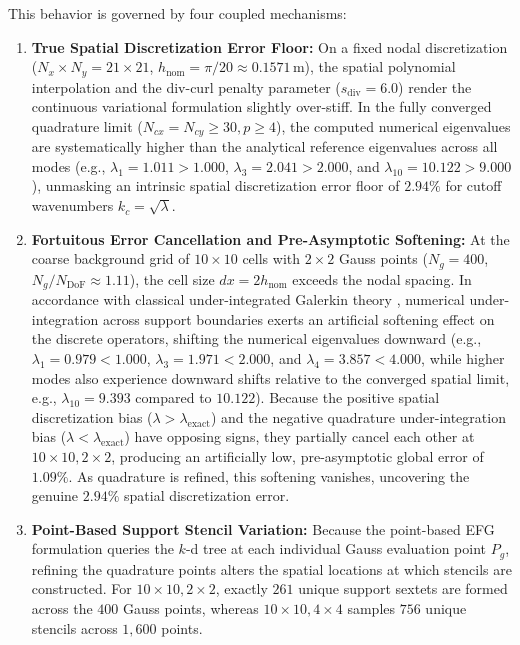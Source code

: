 \documentclass[preprint,12pt]{elsarticle}
\begin{document}
This behavior is governed by four coupled mechanisms:
\begin{enumerate}
    \item \textbf{True Spatial Discretization Error Floor:} On a fixed nodal discretization ($N_x \times N_y = 21 \times 21$, $h_{\mathrm{nom}} = \pi/20 \approx 0.1571$\,m), the spatial polynomial interpolation and the div-curl penalty parameter ($s_{\mathrm{div}} = 6.0$) render the continuous variational formulation slightly over-stiff. In the fully converged quadrature limit ($N_{cx} = N_{cy} \ge 30, p \ge 4$), the computed numerical eigenvalues are systematically higher than the analytical reference eigenvalues across all modes (e.g., $\lambda_1 = 1.011 > 1.000$, $\lambda_3 = 2.041 > 2.000$, and $\lambda_{10} = 10.122 > 9.000$), unmasking an intrinsic spatial discretization error floor of $2.94\%$ for cutoff wavenumbers $k_c = \sqrt{\lambda}$.

    \item \textbf{Fortuitous Error Cancellation and Pre-Asymptotic Softening:} At the coarse background grid of $10 \times 10$ cells with $2 \times 2$ Gauss points ($N_g = 400$, $N_g / N_{\mathrm{DoF}} \approx 1.11$), the cell size $dx = 2h_{\mathrm{nom}}$ exceeds the nodal spacing. In accordance with classical under-integrated Galerkin theory \cite{belytschko1994element, dolbow1999numerical}, numerical under-integration across support boundaries exerts an artificial softening effect on the discrete operators, shifting the numerical eigenvalues downward (e.g., $\lambda_1 = 0.979 < 1.000$, $\lambda_3 = 1.971 < 2.000$, and $\lambda_4 = 3.857 < 4.000$, while higher modes also experience downward shifts relative to the converged spatial limit, e.g., $\lambda_{10} = 9.393$ compared to $10.122$). Because the positive spatial discretization bias ($\lambda > \lambda_{\mathrm{exact}}$) and the negative quadrature under-integration bias ($\lambda < \lambda_{\mathrm{exact}}$) have opposing signs, they partially cancel each other at $10 \times 10, 2 \times 2$, producing an artificially low, pre-asymptotic global error of $1.09\%$. As quadrature is refined, this softening vanishes, uncovering the genuine $2.94\%$ spatial discretization error.

    \item \textbf{Point-Based Support Stencil Variation:} Because the point-based EFG formulation queries the $k$-d tree at each individual Gauss evaluation point $P_g$, refining the quadrature points alters the spatial locations at which stencils are constructed. For $10 \times 10, 2 \times 2$, exactly $261$ unique support sextets are formed across the $400$ Gauss points, whereas $10 \times 10, 4 \times 4$ samples $756$ unique stencils across $1{,}600$ points.


\end{enumerate}
\end{document}
